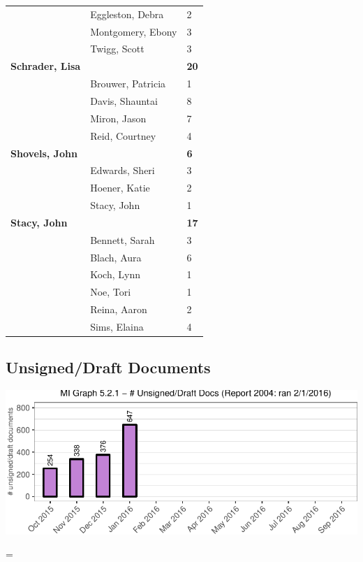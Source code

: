 \documentclass{article}\usepackage[]{graphicx}\usepackage[]{color}
\makeatletter
\def\maxwidth{ %
  \ifdim\Gin@nat@width>\linewidth
    \linewidth
  \else
    \Gin@nat@width
  \fi
}
\newenvironment{knitrout}{}{} %
\newenvironment{absolutelynopagebreak}
  {\par\nobreak\vfil\penalty0\vfilneg
   \vtop\bgroup}
  {\par\xdef\tpd{\the\prevdepth}\egroup
   \prevdepth=\tpd}
\makeatother
\begin{document}
\begin{longtable} { >{\raggedright}p{}|p{}p{}}
   & Eggleston, Debra & 2 \\ 
   & Montgomery, Ebony & 3 \\ 
   \rowcolor[gray]{0.90} & Twigg, Scott & 3 \\ 
   \rowcolor[gray]{0.90}\textbf{Schrader, Lisa} &  & \hspace{2cm}\textbf{\textbf{20}} \\ 
   \rowcolor[gray]{0.90} & Brouwer, Patricia & 1 \\ 
   & Davis, Shauntai & 8 \\ 
   & Miron, Jason & 7 \\ 
   & Reid, Courtney & 4 \\ 
   \rowcolor[gray]{0.90}\textbf{Shovels, John} &  & \hspace{2cm}\textbf{\textbf{6}} \\ 
   \rowcolor[gray]{0.90} & Edwards, Sheri & 3 \\ 
   \rowcolor[gray]{0.90} & Hoener, Katie & 2 \\ 
   & Stacy, John & 1 \\ 
  \textbf{Stacy, John} &  & \hspace{2cm}\textbf{\textbf{17}} \\ 
   & Bennett, Sarah & 3 \\ 
   \rowcolor[gray]{0.90} & Blach, Aura & 6 \\ 
   \rowcolor[gray]{0.90} & Koch, Lynn & 1 \\ 
   \rowcolor[gray]{0.90} & Noe, Tori & 1 \\ 
   & Reina, Aaron & 2 \\ 
   & Sims, Elaina & 4 \\ 
   \end{longtable}


\begin{absolutelynopagebreak}
\subsection{Unsigned/Draft Documents}
\begin{knitrout}
\color{fgcolor}
\includegraphics[width=\maxwidth]{figure/mi_p_unsign-1} 

\end{knitrout}
\end{absolutelynopagebreak}
\end{document}
